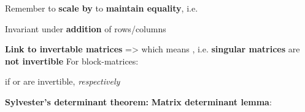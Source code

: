 \begin{itemize}
\begin{itemize}
\begin{itemize}
                              \vItem
                                    Remember to \textbf{scale by } to
                                    \textbf{maintain equality},
                                    i.e. 
                        \end{itemize}
                  \vItem
                        Invariant under \textbf{addition} of rows/columns
            \end{itemize}
      \vItem
            \textbf{Link to invertable matrices} =>
             which means
            , i.e. \textbf{singular matrices} are
            \textbf{not invertible}
      \vItem
            For block-matrices:

            \begin{itemize}

                  \vItem
                  \vItem
                        if  or  are invertible, \emph{respectively}
            \end{itemize}
      \vItem
            \textbf{Sylvester's determinant theorem:}
      \vItem
            \textbf{Matrix determinant lemma}:

            \begin{itemize}


\end{itemize}
\end{itemize}
